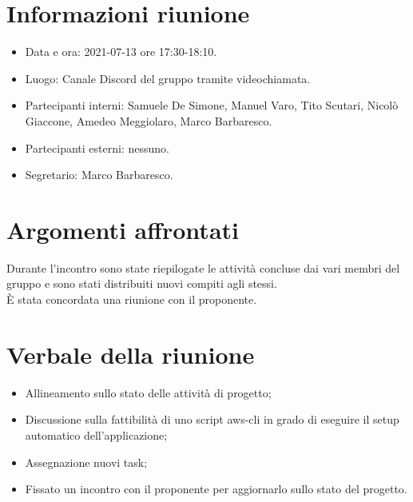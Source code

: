 \documentclass[a4paper]{article}
\begin{document}
\newpage
\tableofcontents
\newpage

\section{Informazioni riunione}
\begin{itemize}
    \item Data e ora: 2021-07-13 ore 17:30-18:10.
    \item Luogo: Canale Discord del gruppo tramite videochiamata.
    \item Partecipanti interni: Samuele De Simone, Manuel Varo, Tito Scutari, Nicolò Giaccone, Amedeo Meggiolaro, Marco Barbaresco.
    \item Partecipanti esterni: nessuno.
    \item Segretario: Marco Barbaresco.
\end{itemize}
\section{Argomenti affrontati}
Durante l'incontro sono state riepilogate le attività concluse dai vari membri del gruppo e sono stati distribuiti nuovi compiti agli stessi.\\
È stata concordata una riunione con il proponente.
\section{Verbale della riunione}
\begin{itemize}
    \item Allineamento sullo stato delle attività di progetto;
    \item Discussione sulla fattibilità di uno script aws-cli in grado di eseguire il setup automatico dell'applicazione;
    \item Assegnazione nuovi task;
    \item Fissato un incontro con il proponente per aggiornarlo sullo stato del progetto.
\end{itemize}
\end{document}
